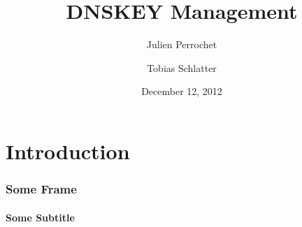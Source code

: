 \documentclass{beamer}
\title{DNSKEY Management}
\author{Julien Perrochet \and Tobias Schlatter}
\date{December 12, 2012}
\institute{ITSEC, EPFL}
\begin{document}
\begin{frame}
  \titlepage
\end{frame}

\section{Introduction}
\begin{frame}
  \frametitle{Some Frame}
  \framesubtitle{Some Subtitle}

\end{frame}
\end{document}
